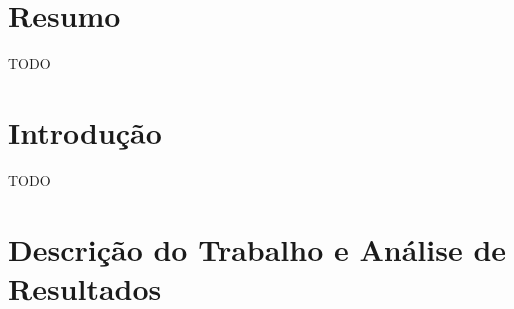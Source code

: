\documentclass{article}
\begin{document}
{\section{Resumo}
{\color{red}TODO}
\vspace*{\fill}

\newpage

\vspace*{\fill}
\tableofcontents
\vspace*{\fill}

\newpage

\vspace*{\fill}
\section{Introdução}
{\color{red}TODO}
\vspace*{\fill}

\newpage

\section{Descrição do Trabalho e Análise de Resultados}

}
\end{document}
